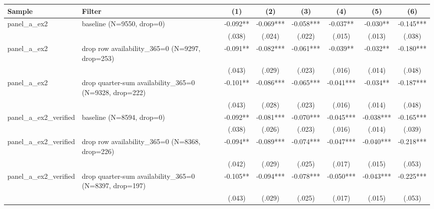 \begin{tabular}{llcccccc}
\hline
Sample & Filter & (1) & (2) & (3) & (4) & (5) & (6) \\
\hline
panel\_a\_ex2 & baseline (N=9550, drop=0) & -0.092** & -0.069*** & -0.058*** & -0.037** & -0.030** & -0.145***
\\
 &  & (.038) & (.024) & (.022) & (.015) & (.013) & (.038)
\\
panel\_a\_ex2 & drop row availability\_365=0 (N=9297, drop=253) & -0.091** & -0.082*** & -0.061*** & -0.039** & -0.032** & -0.180***
\\
 &  & (.043) & (.029) & (.023) & (.016) & (.014) & (.048)
\\
panel\_a\_ex2 & drop quarter-sum availability\_365=0 (N=9328, drop=222) & -0.101** & -0.086*** & -0.065*** & -0.041*** & -0.034** & -0.187***
\\
 &  & (.043) & (.028) & (.023) & (.016) & (.014) & (.048)
\\
panel\_a\_ex2\_verified & baseline (N=8594, drop=0) & -0.092** & -0.081*** & -0.070*** & -0.045*** & -0.038*** & -0.165***
\\
 &  & (.038) & (.026) & (.023) & (.016) & (.014) & (.039)
\\
panel\_a\_ex2\_verified & drop row availability\_365=0 (N=8368, drop=226) & -0.094** & -0.089*** & -0.074*** & -0.047*** & -0.040*** & -0.218***
\\
 &  & (.042) & (.029) & (.025) & (.017) & (.015) & (.053)
\\
panel\_a\_ex2\_verified & drop quarter-sum availability\_365=0 (N=8397, drop=197) & -0.105** & -0.094*** & -0.078*** & -0.050*** & -0.043*** & -0.225***
\\
 &  & (.043) & (.029) & (.025) & (.017) & (.015) & (.053)
\\
\hline
\end{tabular}
